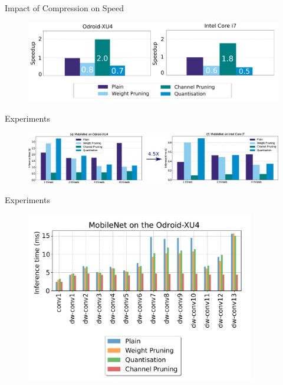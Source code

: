 \documentclass[xcolor=dvipsnames]{beamer}
\begin{document}
\begin{frame}{Impact of Compression on Speed}
    
    \begin{figure}
        \centering
        \includegraphics[width=\linewidth]{images/vgg_speedup.pdf}
    \end{figure}
\end{frame}





\begin{frame}{Experiments}

\begin{figure}
    \centering
    \includegraphics[width=\linewidth]{images/last_two.pdf}
\end{figure}
    
\end{frame}



\begin{frame}{Experiments}
    
    \begin{figure}
        \centering
        \includegraphics[width=10cm]{images/mobilenet-odroid.pdf}
    \end{figure}
    
\end{frame}
\end{document}
